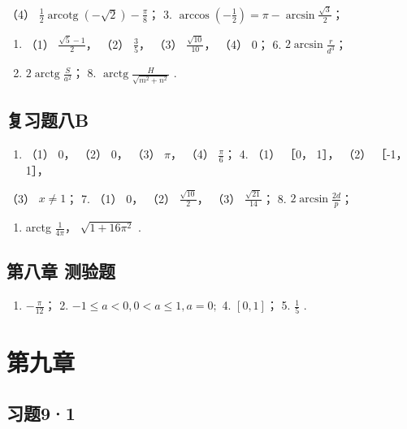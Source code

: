 （4） \(\frac{1}{2}\operatorname{arcotg}(-\sqrt{2}) - \frac{\pi}{8}\)；
3.
\(\arccos\left(-\frac{1}{2}\right) = \pi - \arcsin\frac{\sqrt{3}}{2}\)；

\begin{enumerate}[start=4]
\item
  （1） \(\frac{\sqrt{5} - 1}{2}\)， （2） \(\frac{3}{5}\)， （3）
  \(\frac{\sqrt{10}}{10}\)， （4） 0； 6. \(2\arcsin \frac{r}{d^3}\)；
\item
  \(2\operatorname{arctg}\frac{S}{a^{2}}\)； 8.
  \(\operatorname{arctg}\frac{H}{\sqrt{m^{2}+n^{2}}}\) .
\end{enumerate}

\subsection{复习题八B}

\begin{enumerate}
\item
  （1） 0， （2） 0， （3） \(\pi\)， （4） \(\frac{\pi}{6}\)； 4. （1）
  ［0， 1］， （2） ［-1， 1］，
\end{enumerate}

（3） \(x \neq 1\)； 7. （1） 0， （2） \(\frac{\sqrt{10}}{2}\)， （3）
\(\frac{\sqrt{21}}{14}\)； 8. \(2\arcsin \frac{2d}{p}\)；

\begin{enumerate}[start=9]
\item
  arctg \(\frac{1}{4\pi}\)， \(\sqrt{1+16\pi^{2}}\) .
\end{enumerate}

\subsection{第八章 测验题}

\begin{enumerate}
\item
  \(-\frac{\pi}{12}\)； 2.
  \(-1 \leqslant a < 0, 0 < a \leqslant 1, a = 0;\) 4. \([0, 1]\)； 5.
  \(\frac{1}{5}\) .
\end{enumerate}

\section{第九章}

\subsection{习题9·1}

